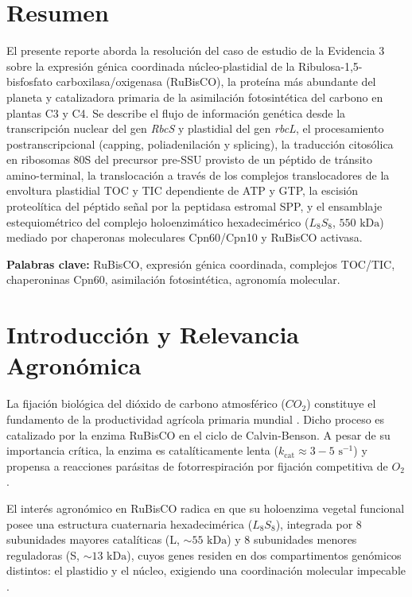 \documentclass[spanish,letterpaper,oneside]{article}
\begin{document}
\hypersetup{pageanchor=false}
\begingroup
\fontsize{14}{17}\selectfont
\renewcommand{\Huge}{\fontsize{14}{17}\selectfont\bfseries}
\renewcommand{\large}{\fontsize{14}{17}\selectfont}
\templatePortrait
\clearpage
\endgroup
\hypersetup{pageanchor=true}
\templatePagecfg
\singlespacing
\setlength{\tabcolsep}{8pt}
\renewcommand{\arraystretch}{1.18}

\section*{Resumen}
El presente reporte aborda la resolución del caso de estudio de la Evidencia 3 sobre la expresión génica coordinada núcleo-plastidial de la Ribulosa-1,5-bisfosfato carboxilasa/oxigenasa (RuBisCO), la proteína más abundante del planeta y catalizadora primaria de la asimilación fotosintética del carbono en plantas C3 y C4. Se describe el flujo de información genética desde la transcripción nuclear del gen \textit{RbcS} y plastidial del gen \textit{rbcL}, el procesamiento postranscripcional (capping, poliadenilación y splicing), la traducción citosólica en ribosomas 80S del precursor pre-SSU provisto de un péptido de tránsito amino-terminal, la translocación a través de los complejos translocadores de la envoltura plastidial TOC y TIC dependiente de ATP y GTP, la escisión proteolítica del péptido señal por la peptidasa estromal SPP, y el ensamblaje estequiométrico del complejo holoenzimático hexadecimérico ($L_8S_8$, $550\text{ kDa}$) mediado por chaperonas moleculares Cpn60/Cpn10 y RuBisCO activasa.

\vspace{0.4cm}
\noindent\textbf{Palabras clave:} RuBisCO, expresión génica coordinada, complejos TOC/TIC, chaperoninas Cpn60, asimilación fotosintética, agronomía molecular.

\section{Introducción y Relevancia Agronómica}
La fijación biológica del dióxido de carbono atmosférico ($CO_2$) constituye el fundamento de la productividad agrícola primaria mundial \parencite{taiz2015}. Dicho proceso es catalizado por la enzima RuBisCO en el ciclo de Calvin-Benson. A pesar de su importancia crítica, la enzima es catalíticamente lenta ($k_{\text{cat}} \approx 3-5\text{ s}^{-1}$) y propensa a reacciones parásitas de fotorrespiración por fijación competitiva de $O_2$ \parencite{alberts2015}.

El interés agronómico en RuBisCO radica en que su holoenzima vegetal funcional posee una estructura cuaternaria hexadecimérica ($L_8S_8$), integrada por 8 subunidades mayores catalíticas (L, $\sim 55\text{ kDa}$) y 8 subunidades menores reguladoras (S, $\sim 13\text{ kDa}$), cuyos genes residen en dos compartimentos genómicos distintos: el plastidio y el núcleo, exigiendo una coordinación molecular impecable \parencite{lodish2016}.
\end{document}
